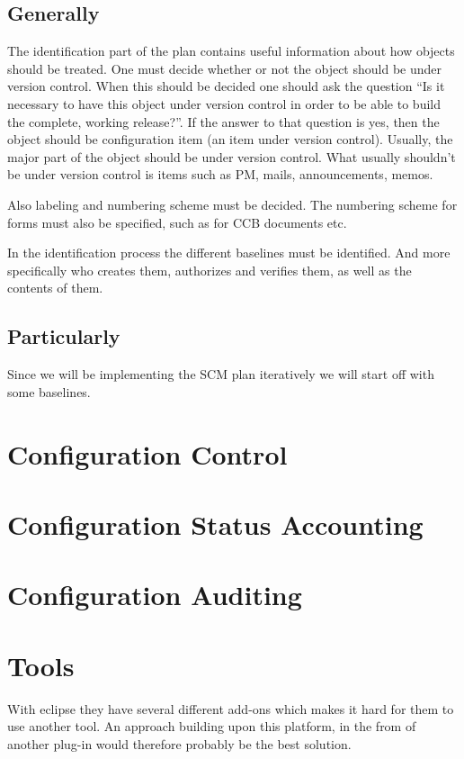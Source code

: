 \documentclass[a4paper,10pt]{article}
\begin{document}
\subsection{Generally}
The identification part of the plan contains useful information about how objects should be treated. One must decide whether or not the object should be under version control. When this should be decided one should ask the question “Is it necessary to have this object under version control in order to be able to build the complete, working release?”. If the answer to that question is yes, then the object should be configuration item (an item under version control).
Usually, the major part of the object should be under version control. What usually shouldn't be under version control is items such as PM, mails, announcements, memos.

Also labeling and numbering scheme must be decided. The numbering scheme for forms must also be specified, such as for CCB documents etc.

In the identification process the different baselines must be identified. And more specifically who creates them, authorizes and verifies them, as well as the contents of them.

\subsection{Particularly}
Since we will be implementing the SCM plan iteratively we will start off with some baselines.

\section{Configuration Control}

\section{Configuration Status Accounting}

\section{Configuration Auditing}

\section{Tools}
With eclipse they have several different add-ons which makes it hard for them to use another tool. An approach building upon this platform, in the from of another plug-in would therefore probably be the best solution.
\end{document}
